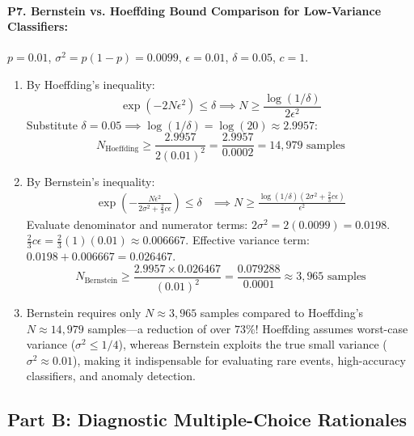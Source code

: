 \paragraph{P7. Bernstein vs. Hoeffding Bound Comparison for Low-Variance Classifiers:}
$p = 0.01$, $\sigma^2 = p(1-p) = 0.0099$, $\epsilon = 0.01$, $\delta = 0.05$, $c = 1$.
\begin{enumerate}[label=(\alph*)]
    \item By Hoeffding's inequality:
    \begin{equation*}
    \exp(-2N\epsilon^2) \le \delta \implies N \ge \frac{\log(1/\delta)}{2\epsilon^2}
    \end{equation*}
    Substitute $\delta = 0.05 \implies \log(1/\delta) = \log(20) \approx 2.9957$:
    \begin{equation*}
    N_{\text{Hoeffding}} \ge \frac{2.9957}{2(0.01)^2} = \frac{2.9957}{0.0002} = 14{,}979 \text{ samples}
    \end{equation*}
    \item By Bernstein's inequality:
    \begin{align*}
    \exp\left(-\frac{N\epsilon^2}{2\sigma^2 + \frac{2}{3}c\epsilon}\right) \le \delta &\implies N \ge \frac{\log(1/\delta)\left(2\sigma^2 + \frac{2}{3}c\epsilon\right)}{\epsilon^2}
    \end{align*}
    Evaluate denominator and numerator terms:
    $2\sigma^2 = 2(0.0099) = 0.0198$.
    $\frac{2}{3}c\epsilon = \frac{2}{3}(1)(0.01) \approx 0.006667$.
    Effective variance term: $0.0198 + 0.006667 = 0.026467$.
    \begin{equation*}
    N_{\text{Bernstein}} \ge \frac{2.9957 \times 0.026467}{(0.01)^2} = \frac{0.079288}{0.0001} \approx 3{,}965 \text{ samples}
    \end{equation*}
    \item Bernstein requires only $N \approx 3{,}965$ samples compared to Hoeffding's $N \approx 14{,}979$ samples---a reduction of over $73\%$! Hoeffding assumes worst-case variance ($\sigma^2 \le 1/4$), whereas Bernstein exploits the true small variance ($\sigma^2 \approx 0.01$), making it indispensable for evaluating rare events, high-accuracy classifiers, and anomaly detection.
\end{enumerate}

\subsection*{Part B: Diagnostic Multiple-Choice Rationales}

